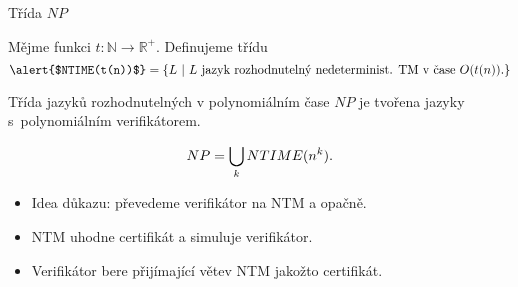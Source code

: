   
    \begin{frame}{Třída $NP$}
    
    
    \begin{definition}[$NP$]
    Mějme funkci $t: \mathbb{N}\to \mathbb{R}^+$. Definujeme třídu
    $$\hbox{\alert{$NTIME(t(n))$}}=
    \{ L\ | \ L \hbox{ jazyk rozhodnutelný nedeterminist. TM v čase $O(t(n))$.}\}
    $$
    \end{definition}
    
    \pause
    \begin{definition*}
    \alert{Třída jazyků rozhodnutelných v polynomiálním čase} \alert{$NP$ }  je tvořena jazyky s~polynomiálním verifikátorem.
    \end{definition*}
    \pause
    
    \begin{theorem}
    $$NP=\bigcup_k NTIME(n^k)\hbox{.}$$
    \end{theorem}
    \pause
    \begin{itemize}
        \item Idea důkazu: převedeme verifikátor na NTM a opačně.
        \item NTM uhodne certifikát a simuluje verifikátor.
        \item Verifikátor bere přijímající větev NTM jakožto certifikát.
    \end{itemize}
    \end{frame}
    
